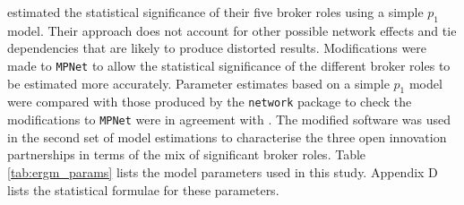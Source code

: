 
\citet{gould1989structures} estimated the statistical significance of their five broker roles using a simple $p_1$ model. Their approach does not account for other possible network effects and tie dependencies that are likely to produce distorted results. Modifications were made to \texttt{MPNet} to allow the statistical significance of the different broker roles to be estimated more accurately. Parameter estimates based on a simple $p_1$ model were compared with those produced by the \texttt{network} package \citep{butts2008network} to check the modifications to \texttt{MPNet} were in agreement with \citet{gould1989structures}. The modified software was used in the second set of model estimations to characterise the three open innovation partnerships in terms of the mix of significant broker roles. Table \ref{tab:ergm_params} lists the model parameters used in this study. Appendix D lists the statistical formulae for these parameters. \medskip

